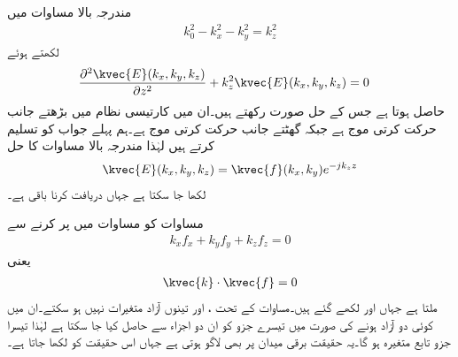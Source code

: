 مندرجہ بالا مساوات میں
\begin{align}\label{مساوات_اینٹینا_حرکی_مستقل_الف}
k_0^2-k_x^2-k_y^2=k_z^2
\end{align}
لکھتے ہوئے
\begin{align}
\frac{\partial^2 \kvec{E}(k_x,k_y,k_z)}{\partial z^2}+k_z^2\kvec{E}(k_x,k_y,k_z)&=0
\end{align}
حاصل ہوتا ہے جس کے حل  صورت رکھتے ہیں۔ان میں  کارتیسی نظام میں بڑھتے  جانب حرکت کرتی موج ہے جبکہ  گھٹتے   جانب حرکت کرتی موج ہے۔ہم پہلے جواب کو تسلیم کرتے ہیں لہٰذا مندرجہ بالا مساوات کا حل
\begin{align}\label{مساوات_اینٹینا_فوریئر_ج}
\kvec{E}(k_x,k_y,k_z)=\kvec{f}(k_x,k_y) e^{-j k_z z}
\end{align}
لکھا جا سکتا ہے جہاں  دریافت کرنا باقی ہے۔

مساوات  کو مساوات  میں پر کرنے سے
\begin{align}
k_x f_x+k_y f_y+k_z f_z=0
\end{align}
یعنی
\begin{align}\label{مساوات_اینٹینا_فوریئر_چ}
\kvec{k} \cdot \kvec{f}=0
\end{align}
ملتا ہے جہاں  اور  لکھے گئے ہیں۔مساوات  کے تحت ،  اور  تینوں آزاد متغیرات نہیں ہو سکتے۔ان میں کوئی دو آزاد ہونے کی صورت میں تیسرے جزو کو ان دو اجزاء سے حاصل کیا جا سکتا ہے لہٰذا تیسرا جزو تابع متغیرہ ہو گا۔یہ حقیقت برقی میدان پر بھی لاگو ہوتی ہے  جہاں اس حقیقت کو  لکھا جاتا ہے۔

